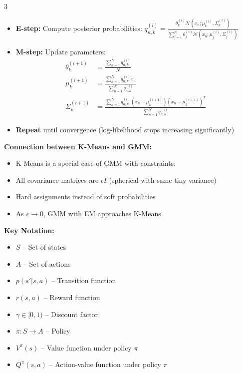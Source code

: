 \documentclass[10pt,landscape]{article}
\begin{document}
\begin{multicols}{3}
\begin{tcolorbox}[breakable, title=Mixture Models, colback=mixture, boxsep=1pt, left=1pt, right=1pt, top=1pt, bottom=1pt]
\begin{itemize}[leftmargin=*,noitemsep,topsep=0pt]
    \item \textbf{E-step:} Compute posterior probabilities:
    $q_{n,k}^{(i)} = \frac{\theta_k^{(i)} \mathcal{N}(x_n; \mu_k^{(i)}, \Sigma_k^{(i)})}{\sum_{j=1}^K \theta_j^{(i)} \mathcal{N}(x_n; \mu_j^{(i)}, \Sigma_j^{(i)})}$
    
    \item \textbf{M-step:} Update parameters:
    \begin{align}
    \theta_k^{(i+1)} &= \frac{\sum_{n=1}^N q_{n,k}^{(i)}}{N}\\
    \mu_k^{(i+1)} &= \frac{\sum_{n=1}^N q_{n,k}^{(i)}x_n}{\sum_{n=1}^N q_{n,k}^{(i)}}\\
    \Sigma_k^{(i+1)} &= \frac{\sum_{n=1}^N q_{n,k}^{(i)}(x_n - \mu_k^{(i+1)})(x_n - \mu_k^{(i+1)})^T}{\sum_{n=1}^N q_{n,k}^{(i)}}
    \end{align}
    
    \item \textbf{Repeat} until convergence (log-likelihood stops increasing significantly)
\end{itemize}

\textbf{Connection between K-Means and GMM:}
\begin{itemize}[leftmargin=*,noitemsep,topsep=0pt]
    \item K-Means is a special case of GMM with constraints:
    \item All covariance matrices are $\epsilon I$ (spherical with same tiny variance)
    \item Hard assignments instead of soft probabilities
    \item As $\epsilon \to 0$, GMM with EM approaches K-Means
\end{itemize}
\end{tcolorbox}

\begin{tcolorbox}[breakable, title=Reinforcement Learning, colback=rl, boxsep=1pt, left=1pt, right=1pt, top=1pt, bottom=1pt]
\textbf{Key Notation:}
\begin{itemize}[leftmargin=*,noitemsep,topsep=0pt]
    \item $S$ -- Set of states
    \item $A$ -- Set of actions
    \item $p(s'|s,a)$ -- Transition function
    \item $r(s,a)$ -- Reward function
    \item $\gamma \in [0,1)$ -- Discount factor
    \item $\pi: S \to A$ -- Policy
    \item $V^\pi(s)$ -- Value function under policy $\pi$
    \item $Q^\pi(s,a)$ -- Action-value function under policy $\pi$
\end{itemize}


\end{tcolorbox}
\end{multicols}
\end{document}
